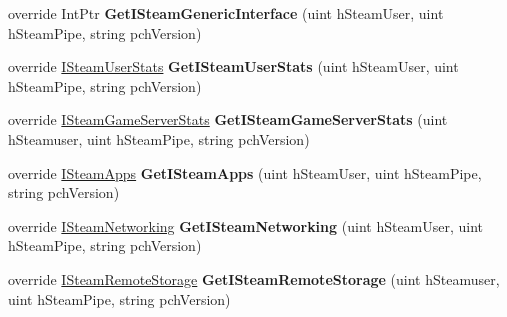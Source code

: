 \begin{DoxyCompactItemize}
\item 
\hypertarget{classValve_1_1Steamworks_1_1CSteamClient_a7b37461a9174d395cbf0e9dd9277207d}{}override Int\+Ptr {\bfseries Get\+I\+Steam\+Generic\+Interface} (uint h\+Steam\+User, uint h\+Steam\+Pipe, string pch\+Version)\label{classValve_1_1Steamworks_1_1CSteamClient_a7b37461a9174d395cbf0e9dd9277207d}

\item 
\hypertarget{classValve_1_1Steamworks_1_1CSteamClient_a9d0ce0e5a0c5337718c13052e2a1533b}{}override \hyperlink{classValve_1_1Steamworks_1_1ISteamUserStats}{I\+Steam\+User\+Stats} {\bfseries Get\+I\+Steam\+User\+Stats} (uint h\+Steam\+User, uint h\+Steam\+Pipe, string pch\+Version)\label{classValve_1_1Steamworks_1_1CSteamClient_a9d0ce0e5a0c5337718c13052e2a1533b}

\item 
\hypertarget{classValve_1_1Steamworks_1_1CSteamClient_a29b3c2377029fde0a61a89e73e1d9a28}{}override \hyperlink{classValve_1_1Steamworks_1_1ISteamGameServerStats}{I\+Steam\+Game\+Server\+Stats} {\bfseries Get\+I\+Steam\+Game\+Server\+Stats} (uint h\+Steamuser, uint h\+Steam\+Pipe, string pch\+Version)\label{classValve_1_1Steamworks_1_1CSteamClient_a29b3c2377029fde0a61a89e73e1d9a28}

\item 
\hypertarget{classValve_1_1Steamworks_1_1CSteamClient_a3f2f35ca227f15416472810ececda405}{}override \hyperlink{classValve_1_1Steamworks_1_1ISteamApps}{I\+Steam\+Apps} {\bfseries Get\+I\+Steam\+Apps} (uint h\+Steam\+User, uint h\+Steam\+Pipe, string pch\+Version)\label{classValve_1_1Steamworks_1_1CSteamClient_a3f2f35ca227f15416472810ececda405}

\item 
\hypertarget{classValve_1_1Steamworks_1_1CSteamClient_a0dc31a9735234391ee54dc5ee6aa60b7}{}override \hyperlink{classValve_1_1Steamworks_1_1ISteamNetworking}{I\+Steam\+Networking} {\bfseries Get\+I\+Steam\+Networking} (uint h\+Steam\+User, uint h\+Steam\+Pipe, string pch\+Version)\label{classValve_1_1Steamworks_1_1CSteamClient_a0dc31a9735234391ee54dc5ee6aa60b7}

\item 
\hypertarget{classValve_1_1Steamworks_1_1CSteamClient_a23790ebf3aab4c95ceba23f1e8fe4a84}{}override \hyperlink{classValve_1_1Steamworks_1_1ISteamRemoteStorage}{I\+Steam\+Remote\+Storage} {\bfseries Get\+I\+Steam\+Remote\+Storage} (uint h\+Steamuser, uint h\+Steam\+Pipe, string pch\+Version)\label{classValve_1_1Steamworks_1_1CSteamClient_a23790ebf3aab4c95ceba23f1e8fe4a84}


\end{DoxyCompactItemize}
